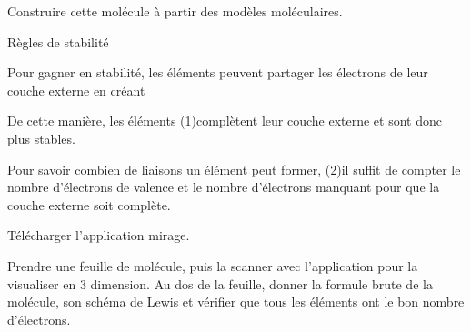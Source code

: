 \mesure
Construire cette molécule à partir des modèles moléculaires.

\begin{doc}{Règles de stabilité}
  \begin{importants}
    Pour gagner en stabilité, les éléments peuvent partager les électrons de leur couche externe en créant 
    
    De cette manière, les éléments \texteTrou(1){complètent leur couche externe et sont donc plus stables.}
    
    Pour savoir combien de liaisons un élément peut former,
    \texteTrou(2){il suffit de compter le nombre d'électrons de valence et le nombre d'électrons manquant pour que la couche externe soit complète.}
  \end{importants}
\end{doc}


\telechargement Télécharger l'application mirage.

\mesure Prendre une feuille de molécule, puis la scanner avec l'application pour la visualiser en 3 dimension.
Au dos de la feuille, donner la formule brute de la molécule, son schéma de Lewis et vérifier que tous les éléments ont le bon nombre d'électrons.
